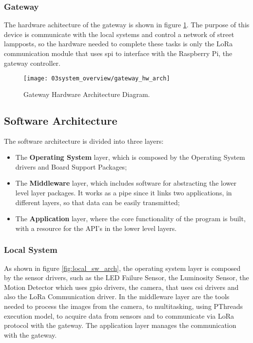 \subsubsection{Gateway}

The hardware achitecture of the gateway is shown in figure \ref{fig:gateway_hw_arch}. The purpose of this device is communicate with the local systems and control a network of street lampposts, so the hardware needed to complete these tasks is only the LoRa communication module that uses \ac{spi} to interface with the Raspberry Pi, the gateway controller.

\begin{figure}[ht]
	\centering
	\texttt{[image: 03system\_overview/gateway\_hw\_arch]}
	\caption{Gateway Hardware Architecture Diagram.}
	\label{fig:gateway_hw_arch}
\end{figure}

\subsection{Software Architecture}
The software architecture is divided into three layers:
\begin{itemize}
        \item The \textbf{Operating System} layer, which is composed by the Operating System drivers and Board Support Packages;
        \item The \textbf{Middleware} layer, which includes software for abstracting the lower level layer packages. It works as a pipe since it links two applications, in different layers, so that data can be easily transmitted;
        \item The \textbf{Application} layer, where the core functionality of the program is built, with a resource for the API's in the lower level layers.
\end{itemize}

\subsubsection{Local System}

As shown in figure \ref{fig:local_sw_arch}, the operating system layer is composed by the sensor drivers, such as the LED Failure Sensor, the Luminosity Sensor, the Motion Detector which uses \ac{gpio} drivers, the camera, that uses \ac{csi} drivers and also the LoRa Communication driver. In the middleware layer are the tools needed to process the images from the camera, to multitasking, using PThreads execution model, to acquire data from sensors and to communicate via LoRa protocol with the gateway. The application layer manages the communication with the gateway.


